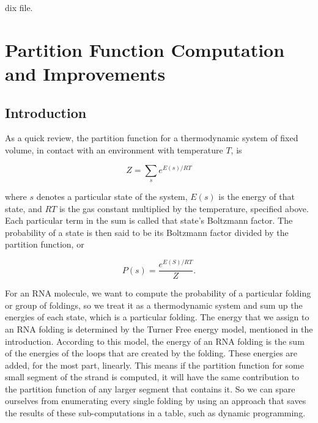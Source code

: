 dix file.
\chapter{Partition Function Computation and Improvements}
\section{Introduction}

As a quick review, the partition function for a thermodynamic system
of fixed volume, in contact with an environment with temperature $T$,
is

\begin{equation} Z = \sum_s e^{E(s)/ RT } \end{equation}

where $s$ denotes a particular state of the system, $E(s)$ is the
energy of that state, and $RT$ is the gas constant multiplied by the
temperature, specified above. Each particular term in the sum is
called that state's Boltzmann factor. The probability of a state is
then said to be its Boltzmann factor divided by the partition
function, or

\begin{equation} P(s) = \frac{e^{E(S)/RT}}{Z}.  \end{equation}

For an RNA molecule, we want to compute the probability of a
particular folding or group of foldings, so we treat it as a
thermodynamic system and sum up the energies of each state, which is a
particular folding. The energy that we assign to an RNA folding is
determined by the Turner Free energy model, mentioned in the
introduction. According to this model, the energy of an RNA folding is
the sum of the energies of the loops that are created by the
folding. These energies are added, for the most part, linearly. This
means if the partition function for some small segment of the strand
is computed, it will have the same contribution to the partition
function of any larger segment that contains it. So we can spare
ourselves from enumerating every single folding by using an approach
that saves the results of these sub-computations in a table, such as
dynamic programming.

